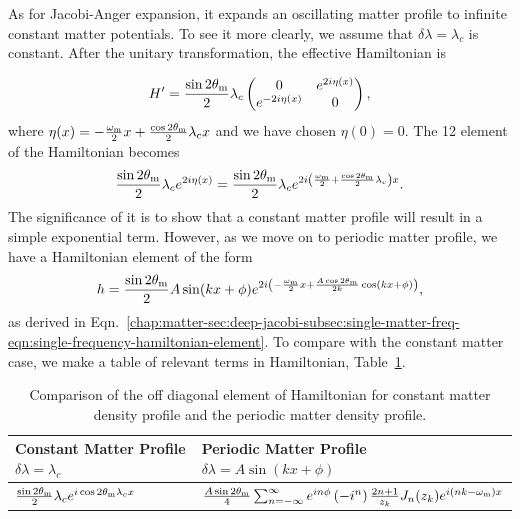 As for Jacobi-Anger expansion, it expands an oscillating matter profile to infinite constant matter potentials. To see it more clearly, we assume that $\delta\lambda= \lambda_c$ is constant. After the unitary transformation, the effective Hamiltonian is

\begin{equation}
   H' = \frac{\sin 2\theta_\mathrm m}{2} \lambda_c \begin{pmatrix} 0 & e^{2i\eta(x)} \\ e^{-2i\eta(x)} & 0 \end{pmatrix},
\end{equation}
where $\eta(x) = -\frac{\omega_\mathrm m}{2}x + \frac{\cos 2\theta_\mathrm m}{2}\lambda_c x$ and we have chosen $\eta(0)=0$.
The 12 element of the Hamiltonian becomes
\begin{equation}
   \frac{\sin 2\theta_\mathrm m}{2} \lambda_c e^{2i\eta(x)} = \frac{\sin 2\theta_\mathrm m}{2} \lambda_c e^{2i\left( \frac{\omega_\mathrm m}{2} + \frac{\cos 2\theta_\mathrm m}{2} \lambda_c \right)x} .
\end{equation}
The significance of it is to show that a constant matter profile will result in a simple exponential term. However, as we move on to periodic matter profile, we have a Hamiltonian element of the form
\begin{equation}
   h = \frac{\sin 2\theta_\mathrm m}{2} A \sin (kx+\phi) e^{2i\left( -\frac{\omega_\mathrm m}{2} x + \frac{A \cos 2\theta_\mathrm m}{2k} \cos (kx+\phi) \right)},
\end{equation}
as derived in Eqn.~\ref{chap:matter-sec:deep-jacobi-subsec:single-matter-freq-eqn:single-frequency-hamiltonian-element}. To compare with the constant matter case, we make a table of relevant terms in Hamiltonian, Table~\ref{chap:matter-sec:deep-jacobi-subsec:single-matter-freq-tab:decomp-hamil-2}.

\begin{table}
\centering
\setlength\tabcolsep{2pt}
\begin{tabular}{l|l}
\hline
 Constant Matter Profile $\delta\lambda = \lambda_c$ &   Periodic Matter Profile $\delta\lambda=A\sin (kx+\phi)$ \\
\hline
   $\frac{\sin 2\theta_\mathrm m}{2}\lambda_c e^{i \cos 2\theta_\mathrm m \lambda_c x}$     &   $\frac{A\sin 2\theta_\mathrm m}{4} \sum_{n=-\infty}^{\infty} e^{in\phi} \left( - i^n \right) \frac{2n+1}{z_k} J_n (z_k) e^{i(nk-\omega_\mathrm m)x}$ \\
\hline
\end{tabular}
\caption{\label{chap:matter-sec:deep-jacobi-subsec:single-matter-freq-tab:decomp-hamil-2} Comparison of the off diagonal element of Hamiltonian for constant matter density profile and the periodic matter density profile.}
\end{table}

